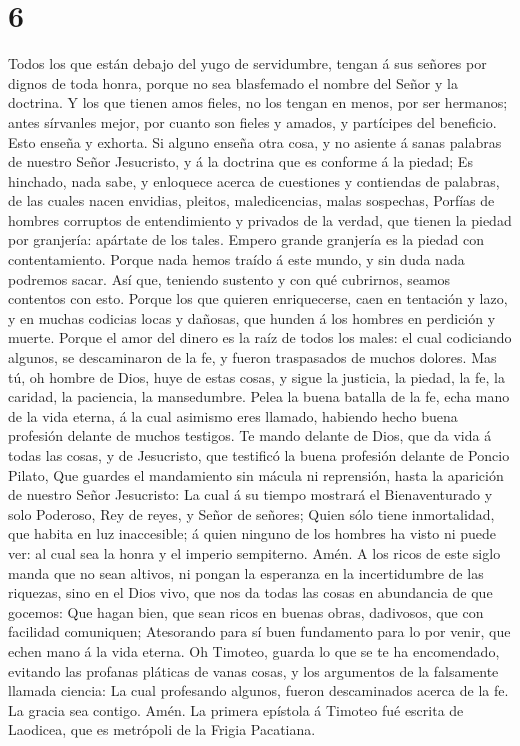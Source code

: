 \hypertarget{section-5}{%
\section{6}\label{section-5}}

 Todos los que están debajo del yugo de servidumbre,
tengan á sus señores por dignos de toda honra, porque no sea blasfemado
el nombre del Señor y la doctrina.  Y los que tienen amos
fieles, no los tengan en menos, por ser hermanos; antes sírvanles mejor,
por cuanto son fieles y amados, y partícipes del beneficio. Esto enseña
y exhorta.  Si alguno enseña otra cosa, y no asiente á
sanas palabras de nuestro Señor Jesucristo, y á la doctrina que es
conforme á la piedad;  Es hinchado, nada sabe, y enloquece
acerca de cuestiones y contiendas de palabras, de las cuales nacen
envidias, pleitos, maledicencias, malas sospechas, 
Porfías de hombres corruptos de entendimiento y privados de la verdad,
que tienen la piedad por granjería: apártate de los tales.
 Empero grande granjería es la piedad con contentamiento.
 Porque nada hemos traído á este mundo, y sin duda nada
podremos sacar.  Así que, teniendo sustento y con qué
cubrirnos, seamos contentos con esto.  Porque los que
quieren enriquecerse, caen en tentación y lazo, y en muchas codicias
locas y dañosas, que hunden á los hombres en perdición y muerte.
 Porque el amor del dinero es la raíz de todos los males:
el cual codiciando algunos, se descaminaron de la fe, y fueron
traspasados de muchos dolores.  Mas tú, oh hombre de
Dios, huye de estas cosas, y sigue la justicia, la piedad, la fe, la
caridad, la paciencia, la mansedumbre.  Pelea la buena
batalla de la fe, echa mano de la vida eterna, á la cual asimismo eres
llamado, habiendo hecho buena profesión delante de muchos testigos.
 Te mando delante de Dios, que da vida á todas las cosas,
y de Jesucristo, que testificó la buena profesión delante de Poncio
Pilato,  Que guardes el mandamiento sin mácula ni
reprensión, hasta la aparición de nuestro Señor Jesucristo:
 La cual á su tiempo mostrará el Bienaventurado y solo
Poderoso, Rey de reyes, y Señor de señores;  Quien sólo
tiene inmortalidad, que habita en luz inaccesible; á quien ninguno de
los hombres ha visto ni puede ver: al cual sea la honra y el imperio
sempiterno. Amén.  A los ricos de este siglo manda que no
sean altivos, ni pongan la esperanza en la incertidumbre de las
riquezas, sino en el Dios vivo, que nos da todas las cosas en abundancia
de que gocemos:  Que hagan bien, que sean ricos en buenas
obras, dadivosos, que con facilidad comuniquen; 
Atesorando para sí buen fundamento para lo por venir, que echen mano á
la vida eterna.  Oh Timoteo, guarda lo que se te ha
encomendado, evitando las profanas pláticas de vanas cosas, y los
argumentos de la falsamente llamada ciencia:  La cual
profesando algunos, fueron descaminados acerca de la fe. La gracia sea
contigo. Amén. La primera epístola á Timoteo fué escrita de Laodicea,
que es metrópoli de la Frigia Pacatiana.
